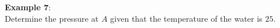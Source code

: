 \documentclass[10pt]{amsart}
\begin{document}
\begin{minipage}[t]{0.45\textwidth}
\end{minipage}
\newpage
\begin{minipage}[t]{0.45\textwidth}
 \raggedright
 \textbf{Example 7}:\\
 Determine the pressure at $A$ given that the temperature of the
 water is $25$\textcelsius.
 \par\vspace{5cm}
\end{minipage}
\hfill
\end{document}
